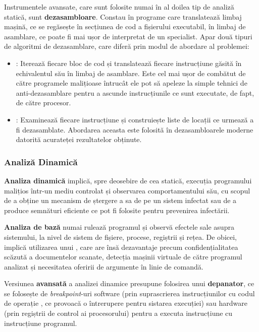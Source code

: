 \documentclass[../../main.tex]{subfiles}
\begin{document}
Instrumentele avansate, care sunt folosite numai în al doilea tip de analiză statică, sunt \textbf{dezasambloare}. Constau în programe care translatează limbaj mașină, ce se regăsește în secțiunea de cod a fișierului executabil, în limbaj de asamblare, ce poate fi mai ușor de interpretat de un specialist. Apar două tipuri de algoritmi de dezasamblare, care diferă prin modul de abordare al problemei:
\begin{itemize}
    \item {}: Iterează fiecare bloc de cod și translatează fiecare instrucțiune găsită în echivalentul său în limbaj de asamblare. Este cel mai ușor de combătut de către programele malițioase întrucât ele pot să apeleze la simple tehnici de anti-dezasamblare pentru a ascunde instrucțiunile ce sunt executate, de fapt, de către procesor.
    \item {}: Examinează fiecare instrucțiune și construiește liste de locații ce urmează a fi dezasamblate. Abordarea aceasta este folosită în dezasambloarele moderne datorită acurateței rezultatelor obținute.
\end{itemize}

\subsubsection{Analiză Dinamică}

\textbf{Analiza dinamică} implică, spre deosebire de cea statică, execuția programului malițios într-un mediu controlat și observarea comportamentului său, cu scopul de a obține un mecanism de ștergere a sa de pe un sistem infectat sau de a produce semnături eficiente ce pot fi folosite pentru prevenirea infectării.

\textbf{Analiza de bază} numai rulează programul și observă efectele sale asupra sistemului, la nivel de sistem de fișiere, procese, regiștrii și rețea. De obicei, implică utilizarea unui , care are însă dezavantaje precum confidențialita\-tea scăzută a documentelor scanate, detecția mașinii virtuale de către programul analizat și necesitatea oferirii de argumente în linie de comandă.

Versiunea \textbf{avansată} a analizei dinamice presupune folosirea unui \textbf{depanator}, ce se folosește de \textit{breakpoint}-uri software (prin suprascrierea instrucțiunilor cu codul de operație , ce provoacă o întrerupere pentru sistarea execuției) sau hardware (prin regiștrii de control ai procesorului) pentru a executa instrucț\-iune cu instrucțiune programul.
\end{document}
